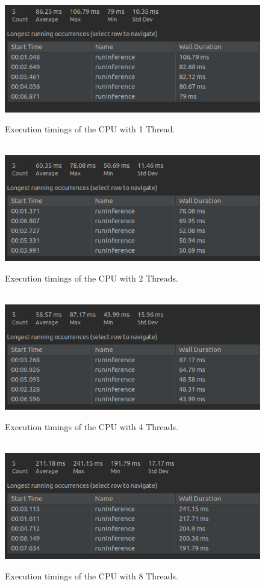 \documentclass[12pt,a4paper]{report}
\begin{document}
\begin{figure}[h]\
    \includegraphics[width=\textwidth]{CPU1_Time.png}
    \caption{Execution timings of the CPU with 1 Thread.}
    \label{fig:cpu1}
\end{figure}


\begin{figure}[h]\
    \includegraphics[width=\textwidth]{CPU2_Time.png}
    \caption{Execution timings of the CPU with 2 Threads.}
    \label{fig:cpu2}
\end{figure}

\begin{figure}[h]\
    \includegraphics[width=\textwidth]{CPU4_Time.png}
    \caption{Execution timings of the CPU with 4 Threads.}
    \label{fig:cpu4}
\end{figure}

\begin{figure}[h]\
    \includegraphics[width=\textwidth]{CPU8_Time.png}
    \caption{Execution timings of the CPU with 8 Threads.}
    \label{fig:cpu8}
\end{figure}
\end{document}
